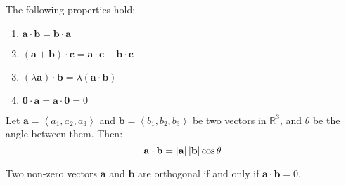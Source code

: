 \documentclass{huhtakm-template-book}
\begin{document}
\begin{lem}
    The following properties hold:
    \begin{enumerate}
        \item $\mathbf{a}\cdot\mathbf{b}=\mathbf{b}\cdot\mathbf{a}$
        \item $(\mathbf{a}+\mathbf{b})\cdot\mathbf{c}=\mathbf{a}\cdot\mathbf{c}+\mathbf{b}\cdot\mathbf{c}$
        \item $(\lambda\mathbf{a})\cdot\mathbf{b}=\lambda(\mathbf{a}\cdot\mathbf{b})$
        \item $\mathbf{0}\cdot\mathbf{a}=\mathbf{a}\cdot\mathbf{0}=0$
    \end{enumerate}
\end{lem}
\begin{thm}
    Let $\mathbf{a}=\left<a_{1},a_{2},a_{3}\right>$ and $\mathbf{b}=\left<b_{1},b_{2},b_{3}\right>$ be two vectors in $\mathbb{R}^{3}$, and $\theta$ be the angle between them. Then:
    \begin{equation*}
        \mathbf{a}\cdot\mathbf{b}=\left|{\mathbf{a}}\right|\left|{\mathbf{b}}\right|\cos\theta
    \end{equation*}
\end{thm}
\begin{cor}
    Two non-zero vectors $\mathbf{a}$ and $\mathbf{b}$ are orthogonal if and only if $\mathbf{a}\cdot\mathbf{b}=0$.
\end{cor}
\end{document}
